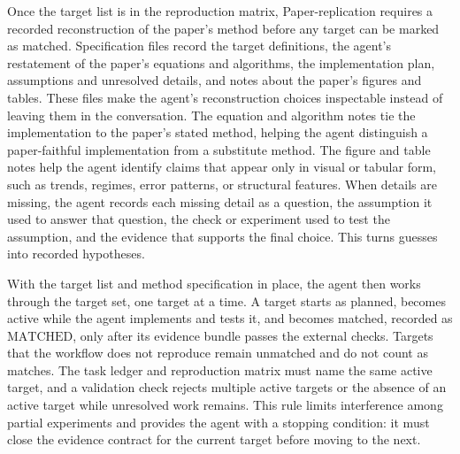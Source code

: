 \documentclass[authoryear,5p,times,nopreprintline]{elsarticle}
\begin{document}
Once the target list is in the reproduction matrix, Paper-replication requires a recorded reconstruction of the paper's method before any target can be marked as matched.
Specification files record the target definitions, the agent's restatement of the paper's equations and algorithms, the implementation plan, assumptions and unresolved details, and notes about the paper's figures and tables.
These files make the agent's reconstruction choices inspectable instead of leaving them in the conversation.
The equation and algorithm notes tie the implementation to the paper's stated method, helping the agent distinguish a paper-faithful implementation from a substitute method.
The figure and table notes help the agent identify claims that appear only in visual or tabular form, such as trends, regimes, error patterns, or structural features.
When details are missing, the agent records each missing detail as a question, the assumption it used to answer that question, the check or experiment used to test the assumption, and the evidence that supports the final choice.
This turns guesses into recorded hypotheses.

With the target list and method specification in place, the agent then works through the target set, one target at a time.
A target starts as planned, becomes active while the agent implements and tests it, and becomes matched, recorded as \(\mathrm{MATCHED}\), only after its evidence bundle passes the external checks.
Targets that the workflow does not reproduce remain unmatched and do not count as matches.
The task ledger and reproduction matrix must name the same active target, and a validation check rejects multiple active targets or the absence of an active target while unresolved work remains.
This rule limits interference among partial experiments and provides the agent with a stopping condition: it must close the evidence contract for the current target before moving to the next.
\end{document}
